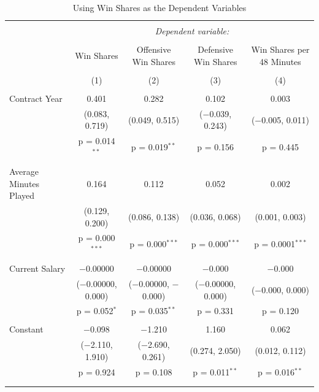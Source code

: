 \documentclass[12pt]{article}
\begin{document}
\begin{landscape}
		\begin{table}[!htbp] \centering 
			\caption{Using Win Shares as the Dependent Variables} 
			\label{regwinshare}
			\begin{tabular}{@{\extracolsep{5pt}}lcccc} 
				\\[-1.8ex]\hline 
				\hline \\[-1.8ex] 
				& \multicolumn{4}{c}{\textit{Dependent variable:}} \\ 
				\cline{2-5} 
				\\[-1.8ex] & Win Shares & Offensive Win Shares & Defensive Win Shares & Win Shares per 48 Minutes \\ 
				\\[-1.8ex] & (1) & (2) & (3) & (4)\\ 
				\hline \\[-1.8ex] 
				Contract Year & 0.401 & 0.282 & 0.102 & 0.003 \\ 
				& (0.083, 0.719) & (0.049, 0.515) & ($-$0.039, 0.243) & ($-$0.005, 0.011) \\ 
				& p = 0.014$^{**}$ & p = 0.019$^{**}$ & p = 0.156 & p = 0.445 \\ 
				& & & & \\ 
				Average Minutes Played & 0.164 & 0.112 & 0.052 & 0.002 \\ 
				& (0.129, 0.200) & (0.086, 0.138) & (0.036, 0.068) & (0.001, 0.003) \\ 
				& p = 0.000$^{***}$ & p = 0.000$^{***}$ & p = 0.000$^{***}$ & p = 0.0001$^{***}$ \\ 
				& & & & \\ 
				Current Salary & $-$0.00000 & $-$0.00000 & $-$0.000 & $-$0.000 \\ 
				& ($-$0.00000, 0.000) & ($-$0.00000, $-$0.000) & ($-$0.00000, 0.000) & ($-$0.000, 0.000) \\ 
				& p = 0.052$^{*}$ & p = 0.035$^{**}$ & p = 0.331 & p = 0.120 \\ 
				& & & & \\ 
				Constant & $-$0.098 & $-$1.210 & 1.160 & 0.062 \\ 
				& ($-$2.110, 1.910) & ($-$2.690, 0.261) & (0.274, 2.050) & (0.012, 0.112) \\ 
				& p = 0.924 & p = 0.108 & p = 0.011$^{**}$ & p = 0.016$^{**}$ \\ 
				& & & & \\ 
				\hline \\[-1.8ex] 

\end{tabular}
\end{table}
\end{landscape}
\end{document}
